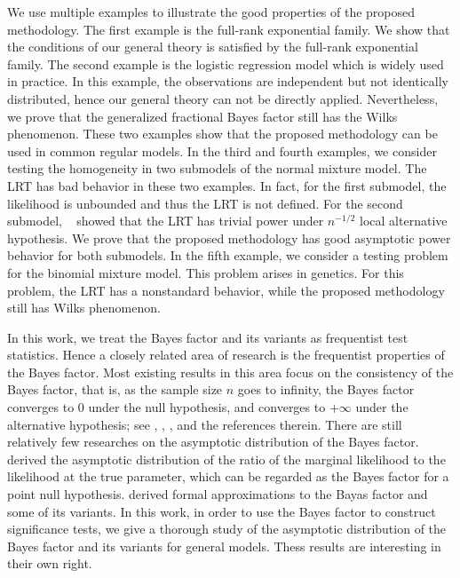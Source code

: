 \documentclass[11pt]{article}
\theoremstyle{plain}
\theoremstyle{definition}
\theoremstyle{remark}
\begin{document}
We use multiple examples to illustrate the good properties of the proposed methodology.
The first example is the full-rank exponential family.
We show that the conditions of our general theory is satisfied by the full-rank exponential family.
The second example is the logistic regression model which is widely used in practice.
In this example, the observations are independent but not identically distributed, hence our general theory can not be directly applied.
Nevertheless, we prove that the generalized fractional Bayes factor still has the Wilks phenomenon.
These two examples show that the proposed methodology can be used in common regular models.
In the third and fourth examples, we consider testing the homogeneity in two submodels of the normal mixture model.
The LRT has bad behavior in these two examples.
In fact, for the first submodel, the likelihood is unbounded and thus the LRT is not defined.
For the second submodel, %
~\cite{HALL2005158} showed that the LRT has trivial power under $n^{-1/2}$ local alternative hypothesis. 
We prove that the proposed methodology has good asymptotic power behavior for both submodels.
In the fifth example, we consider a testing problem for the binomial mixture model.
This problem arises in genetics.
For this problem, the LRT has a nonstandard behavior, while the proposed methodology still has Wilks phenomenon.

In this work, we treat the Bayes factor and its variants as frequentist test statistics.
Hence a closely related area of research is the frequentist properties of the Bayes factor.
Most existing results in this area focus on the consistency of the Bayes factor, that is, as the sample size $n$ goes to infinity, the Bayes factor converges to $0$ under the null hypothesis, and converges to $+\infty$ under the alternative hypothesis; see \cite{berger2003approximations}, \cite{moreno2010}, \cite{WangMin2016}, \cite{Chatterjee2017} and the references therein.
There are still relatively few researches on the asymptotic distribution of the Bayes factor.
\cite{clarke1990information} derived the asymptotic distribution of the ratio of the marginal likelihood to the likelihood at the true parameter, which can be regarded as the Bayes factor for a point null hypothesis.
\cite{Gelfand1994} derived formal approximations to the Bayas factor and some of its variants.
In this work, in order to use the Bayes factor to construct significance tests, we give a thorough study of the asymptotic distribution of the Bayes factor and its variants for general models.
Thess results are interesting in their own right.
\end{document}
